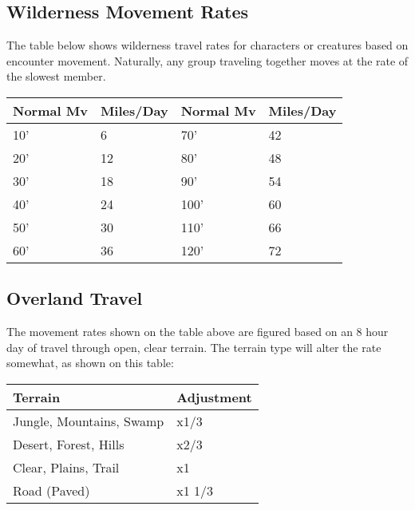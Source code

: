 \documentclass[a4paper,twoside,openany,10pt]{book}
\begin{document}
\begin{multicols}{2}

\subsection{Wilderness Movement Rates}\label{wilderness-movement-rates}

The table below shows wilderness travel rates for characters or creatures based on encounter movement. Naturally, any group traveling together moves at the rate of the slowest member.\\

\begin{tabular}[]{@{}ll|ll@{}}

\textbf{Normal Mv}&\textbf{Miles/Day}&\textbf{Normal Mv}&\textbf{Miles/Day}\\\toprule
10' & 6 &  70' & 42 \\\hline
20' & 12 & 80' & 48 \\\hline
30' & 18 & 90' & 54 \\\hline
40' & 24 & 100' & 60 \\\hline
50' & 30 & 110' & 66 \\\hline
60' & 36 & 120' & 72 \\\bottomrule
\end{tabular}

\subsection{Overland Travel}\label{overland-travel}

The movement rates shown on the table above are figured based on an 8 hour day of travel through open, clear terrain. The terrain type will alter the rate somewhat, as shown on this table:\\

\begin{tabular*}{0.93\linewidth}{@{\extracolsep{\fill}}ll}
\textbf{Terrain} & \textbf{Adjustment} \\\toprule
Jungle, Mountains, Swamp & x1/3 \\\hline
Desert, Forest, Hills & x2/3 \\\hline
Clear, Plains, Trail & x1 \\\hline
Road (Paved) & x1 1/3 \\\bottomrule
\end{tabular*}\\\medskip


\end{multicols}
\end{document}
